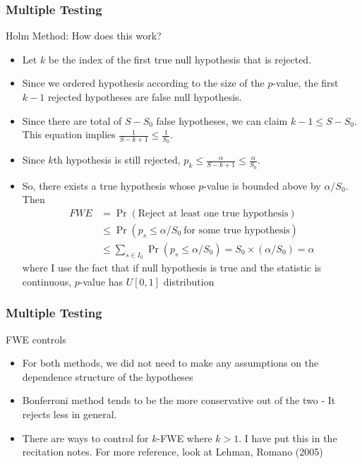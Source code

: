 \documentclass{beamer}
\begin{document}
\begin{frame}
\frametitle{Multiple Testing}
Holm Method: How does this work?
\begin{itemize}
\item Let $k$ be the index of the first true null hypothesis that is rejected. 
\item Since we ordered hypothesis according to the size of the $p$-value, the first $k-1$ rejected hypotheses are false null hypothesis.
\item Since there are total of $S-S_0$ false hypotheses, we can claim $k-1\leq S-S_0$. This equation implies $\frac{1}{S-k+1}\leq\frac{1}{S_0}$. 
\item Since $k$th hypothesis is still rejected, $p_k\leq\frac{\alpha}{S-k+1}\leq \frac{\alpha}{S_0}$.
\item  So, there exists a true hypothesis whose $p$-value is bounded above by $\alpha/S_0$.  Then
\begin{align*}
FWE&=\Pr(\text{Reject at least one true hypothesis})\\
&\leq \Pr(p_s\leq \alpha/S_0\ \text{for some true hypothesis})\\
&\leq \sum_{s\in I_0}\Pr(p_s\leq \alpha/S_0) = S_0\times (\alpha/S_0)=\alpha
\end{align*}
where I use the fact that if null hypothesis is true and the statistic is continuous, $p$-value has $U[0,1]$ distribution
\end{itemize}
\end{frame}

\begin{frame}
\frametitle{Multiple Testing}
FWE controls
\begin{itemize}
\item For both methods, we did not need to make any assumptions on the dependence structure of the hypotheses
\item Bonferroni method tends to be the more conservative out of the two - It rejects less in general. 
\item There are ways to control for $k$-FWE where $k>1$. I have put this in the recitation notes. For more reference, look at Lehman, Romano (2005)
\end{itemize}
\end{frame}
\end{document}
